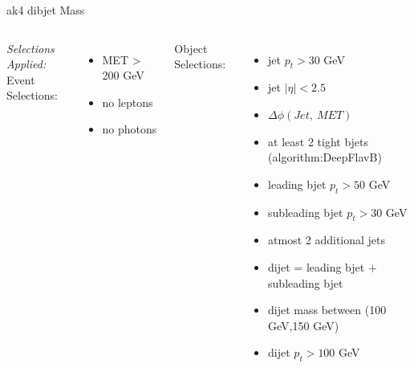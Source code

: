 \documentclass[10pt,xcolor=dvipsnames]{beamer}
\begin{document}
\begin{frame}[fragile]{ak4 dibjet Mass}
\begin{columns}
        \textit{Selections Applied:} \\
        Event Selections:
        \begin{itemize}
          \raggedright 
          \tiny
          \item {MET > 200 GeV}
          \item {no leptons}
          \item {no photons}
        \end{itemize}
        Object Selections:
        \begin{itemize}
          \raggedright 
          \tiny
          \item {jet $p_t > 30 $ GeV}
          \item {jet $| \eta | < 2.5 $}
          \item {$\Delta \phi (Jet, \ MET)$}
          \item {at least 2 tight bjets (algorithm:DeepFlavB)}
          \item {leading bjet $p_t > 50 $ GeV}
          \item {subleading bjet $p_t > 30 $ GeV}
          \item {atmost 2 additional jets}
          \item {dijet = leading bjet + subleading bjet}
          \item {dijet mass between (100 GeV,150 GeV)}
          \item {dijet $p_t > 100 $ GeV}
        \end{itemize}
      \end{columns}
    \end{frame}

\end{document}
